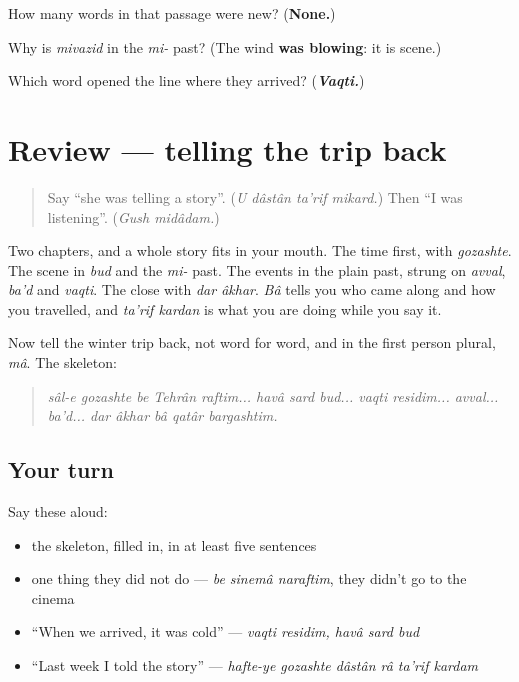 \begin{tcolorbox}[breakable,colback=teal!4,colframe=teal!35!black,title={Before you move on}]
How many words in that passage were new? (\textbf{None.})

Why is \emph{mivazid} in the \emph{mi-} past? (The wind \textbf{was blowing}: it is scene.)

Which word opened the line where they arrived? (\emph{\textbf{Vaqti.}})
\end{tcolorbox}
\section[(review)]{Review — telling the trip back}

\label{lesson:FA-R291-a-story-in-order}



\begin{quote}
Say \textquotedblleft{}she was telling a story\textquotedblright{}. (\emph{U dâstân ta'rif mikard.}) Then \textquotedblleft{}I was listening\textquotedblright{}. (\emph{Gush midâdam.})
\end{quote}

\begin{grammarlens}[title={What you've built}]
Two chapters, and a whole story fits in your mouth. The time first, with \emph{gozashte}. The scene in \emph{bud} and the \emph{mi-} past. The events in the plain past, strung on \emph{avval}, \emph{ba'd} and \emph{vaqti}. The close with \emph{dar âkhar}. \emph{Bâ} tells you who came along and how you travelled, and \emph{ta'rif kardan} is what you are doing while you say it.

Now tell the winter trip back, not word for word, and in the first person plural, \emph{mâ}. The skeleton:

\begin{quote}
\emph{sâl-e gozashte be Tehrân raftim... havâ sard bud... vaqti residim... avval... ba'd... dar âkhar bâ qatâr bargashtim.}
\end{quote}
\end{grammarlens}

\subsection*{Your turn}
Say these aloud:

\begin{itemize}
\raggedright
  \item the skeleton, filled in, in at least five sentences
  \item one thing they did not do — \emph{be sinemâ naraftim}, they didn't go to the cinema
  \item \textquotedblleft{}When we arrived, it was cold\textquotedblright{} — \emph{vaqti residim, havâ sard bud}
  \item \textquotedblleft{}Last week I told the story\textquotedblright{} — \emph{hafte-ye gozashte dâstân râ ta'rif kardam}
\end{itemize}

